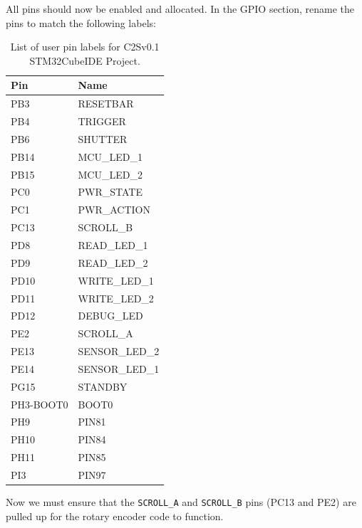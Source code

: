 All pins should now be enabled and allocated. In the GPIO section, rename the pins to match the following labels:
\begin{table}[H]
    \centering
    \begin{tabular}{ll}
        \hline
        \textbf{Pin} & \textbf{Name} \\
        \hline
        PB3 & RESETBAR \\
        PB4 & TRIGGER \\
        PB6 & SHUTTER \\
        PB14 & MCU\_LED\_1 \\
        PB15 & MCU\_LED\_2 \\
        PC0 & PWR\_STATE \\
        PC1 & PWR\_ACTION \\
        PC13 & SCROLL\_B \\
        PD8 & READ\_LED\_1 \\
        PD9 & READ\_LED\_2 \\
        PD10 & WRITE\_LED\_1 \\
        PD11 & WRITE\_LED\_2 \\
        PD12 & DEBUG\_LED \\
        PE2 & SCROLL\_A \\
        PE13 & SENSOR\_LED\_2 \\
        PE14 & SENSOR\_LED\_1 \\
        PG15 & STANDBY \\
        PH3-BOOT0 & BOOT0 \\
        PH9 & PIN81 \\
        PH10 & PIN84 \\
        PH11 & PIN85 \\
        PI3 & PIN97 \\
        \hline
    \end{tabular}
    \caption{List of user pin labels for C2Sv0.1 STM32CubeIDE Project.}
\end{table}

Now we must ensure that the \verb|SCROLL_A| and \verb|SCROLL_B| pins (PC13 and PE2) are pulled up for the rotary encoder code to function.